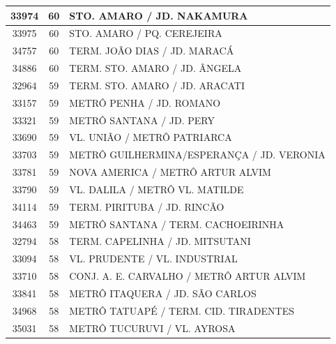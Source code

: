 \documentclass[
	12pt,				%
	oneside,			%
	a4paper,			%
	english,			%
	brazil				%
	]{abntex2ppgsi}
\begin{document}
\begin{apendicesenv}
\begin{longtable}{c|c|p{7cm}}
    33974 & 60    & STO. AMARO / JD. NAKAMURA \\
\hline

    33975 & 60    & STO. AMARO / PQ. CEREJEIRA \\
\hline

    34757 & 60    & TERM. JOÃO DIAS / JD. MARACÁ \\
\hline

    34886 & 60    & TERM. STO. AMARO / JD. ÂNGELA \\
\hline

    32964 & 59    & TERM. STO. AMARO / JD. ARACATI \\
\hline

    33157 & 59    & METRÔ PENHA / JD. ROMANO \\
\hline

    33321 & 59    & METRÔ SANTANA / JD. PERY \\
\hline

    33690 & 59    & VL. UNIÃO / METRÔ PATRIARCA \\
\hline

    33703 & 59    & METRÔ GUILHERMINA/ESPERANÇA / JD. VERONIA \\
\hline

    33781 & 59    & NOVA AMERICA / METRÔ ARTUR ALVIM \\
\hline

    33790 & 59    & VL. DALILA / METRÔ VL. MATILDE \\
\hline

    34114 & 59    & TERM. PIRITUBA / JD. RINCÃO \\
\hline

    34463 & 59    & METRÔ SANTANA / TERM. CACHOEIRINHA \\
\hline

    32794 & 58    & TERM. CAPELINHA / JD. MITSUTANI \\
\hline

    33094 & 58    & VL. PRUDENTE / VL. INDUSTRIAL \\
\hline

    33710 & 58    & CONJ. A. E. CARVALHO / METRÔ ARTUR ALVIM \\
\hline

    33841 & 58    & METRÔ ITAQUERA / JD. SÃO CARLOS \\
\hline

    34968 & 58    & METRÔ TATUAPÉ / TERM. CID. TIRADENTES \\
\hline

    35031 & 58    & METRÔ TUCURUVI / VL. AYROSA \\
\hline


\end{longtable}
\end{apendicesenv}
\end{document}
